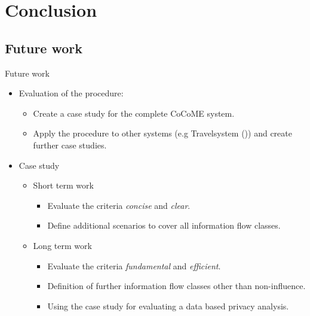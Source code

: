 \documentclass[18pt]{beamer}
\begin{document}
\section{Conclusion}
\subsection{Future work}
\begin{frame}{Future work}
\begin{itemize}
\item Evaluation of the procedure:
\begin{itemize}
\item Create a case study for the complete CoCoME system.
\item Apply the procedure to other systems (e.g Travelsystem (\cite{Travelsystem})) and create further case studies.
\end{itemize}
\item Case study
\begin{itemize}
\item Short term work
\begin{itemize}
\item Evaluate the criteria \textit{concise} and \textit{clear}. 
\item Define additional scenarios to cover all information flow classes.
\end{itemize}

\item Long term work
\begin{itemize}
\item Evaluate the criteria \textit{fundamental} and \textit{efficient}.
\item Definition of further information flow classes other than non-influence. 
\item Using the case study for evaluating a data based privacy analysis.
\end{itemize}
\end{itemize}

\end{itemize}
\end{frame}
\end{document}
